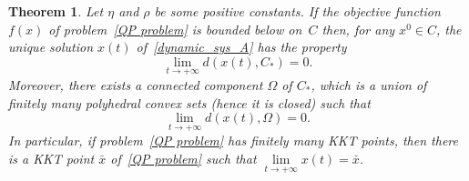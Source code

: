 \documentclass[11pt]{article}
\newtheorem{theorem}{Theorem}
\theoremstyle{definition}
\theoremstyle{remark}
\begin{document}
\begin{theorem}\label{thm1}
Let $\eta$ and $\rho$ be some positive constants. If the objective function $f(x)$ of problem~\eqref{QP problem} is bounded below on~$C$ then, for any $x^0\in C$, the unique solution $x(t)$ of~\eqref{dynamic_sys_A} has the property 
\begin{equation}\label{convergence_1}\lim\limits_{t\to +\infty} d(x(t),C_*) = 0.
\end{equation} Moreover, there exists a connected component $\Omega$ of $C_*$, which is a union of finitely many polyhedral convex sets (hence it is closed) such that 
\begin{equation}\label{convergence_1a}\lim\limits_{t\to +\infty} d(x(t),\Omega) = 0.
\end{equation} In particular, if problem~\eqref{QP problem} has finitely many KKT points, then there is a KKT point $\bar x$ of~\eqref{QP problem} such that $\lim\limits_{t\to +\infty} x(t)=\bar x$. 
\end{theorem}
\end{document}
